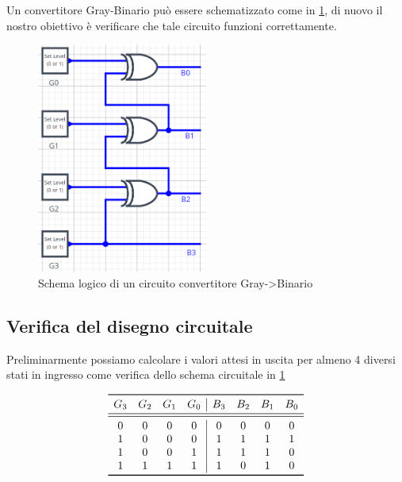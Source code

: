 \documentclass[10pt, a4paper, italian]{article}
\begin{document}
Un convertitore Gray-Binario può essere schematizzato come in \cref{fig: gb},
di nuovo il nostro obiettivo è verificare che tale circuito funzioni
correttamente.
\begin{figure}[htbp]
    \centering
    \includegraphics[width=0.5\textwidth]{gb}
    \caption{Schema logico di un circuito convertitore Gray->Binario
    \label{fig: gb}}
\end{figure}

\subsection{Verifica del disegno circuitale}
Preliminarmente possiamo calcolare i valori attesi in uscita per almeno
4 diversi stati in ingresso come verifica dello schema circuitale in
\cref{fig: gb}
\begin{table}[htbp]
    \centering
    \[
    \begin{array}{cccc|cccc}
    \toprule
        G_3 & G_2 & G_1 & G_0 & B_3 & B_2 & B_1 & B_0 \\
        \midrule
        \midrule
        0 & 0 & 0 & 0 & 0 & 0 & 0 & 0 \\
        1 & 0 & 0 & 0 & 1 & 1 & 1 & 1 \\
		1 & 0 & 0 & 1 & 1 & 1 & 1 & 0 \\        
        1 & 1 & 1 & 1 & 1 & 0 & 1 & 0 \\
    \bottomrule
    \end{array}
    \]
\end{table}
\end{document}
